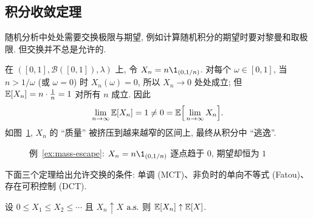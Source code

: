 \subsection{积分收敛定理}

随机分析中处处需要交换极限与期望, 例如计算随机积分的期望时要对黎曼和取极限. 但交换并不总是允许的.

\begin{example}[质量逃逸]\label{ex:mass-escape}
在 $([0,1],\mathcal{B}([0,1]),\lambda)$ 上, 令 $X_n=n\1_{(0,1/n)}$. 对每个 $\omega\in[0,1]$, 当 $n>1/\omega$ (或 $\omega=0$) 时 $X_n(\omega)=0$, 所以 $X_n\to0$ 处处成立; 但 $\mathbb{E}[X_n]=n\cdot\frac{1}{n}=1$ 对所有 $n$ 成立. 因此
\[
\lim_{n\to\infty}\mathbb{E}[X_n]=1\ne0=\mathbb{E}\Big[\lim_{n\to\infty}X_n\Big].
\]
如图~\ref{fig:mass-escape}, $X_n$ 的 ``质量'' 被挤压到越来越窄的区间上, 最终从积分中 ``逃逸''.
\end{example}

\begin{figure}[htbp]
\centering
{}
\caption{例~\ref{ex:mass-escape}: $X_n=n\1_{(0,1/n)}$ 逐点趋于 $0$, 期望却恒为 $1$}
\label{fig:mass-escape}
\end{figure}

下面三个定理给出允许交换的条件: 单调 (MCT)、非负时的单向不等式 (Fatou)、存在可积控制 (DCT).

\begin{theorem}\label{thm:mct}
设 $0\le X_1\le X_2\le\cdots$ 且 $X_n\uparrow X$ $\text{a.s.}$ 则 $\mathbb{E}[X_n]\uparrow\mathbb{E}[X]$.
\end{theorem}

